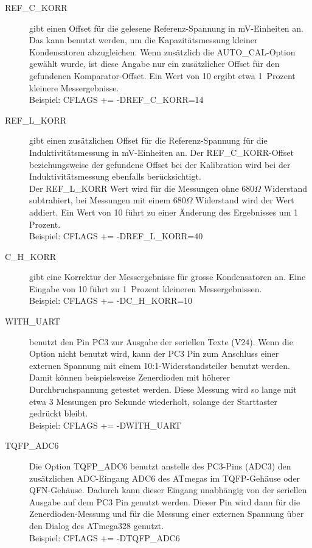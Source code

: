 \begin{description}
  \item[REF\_C\_KORR] gibt einen Offset für die gelesene Referenz-Spannung in mV-Einheiten an.
Das kann benutzt werden, um die Kapazitätsmessung kleiner Kondensatoren abzugleichen.
Wenn zusätzlich die AUTO\_CAL-Option gewählt wurde, ist diese Angabe nur ein zusätzlicher Offset für
den gefundenen Komparator-Offset.
Ein Wert von 10 ergibt etwa 1~Prozent kleinere Messergebnisse.\\
Beispiel: CFLAGS += -DREF\_C\_KORR=14

  \item[REF\_L\_KORR] gibt einen zusätzlichen Offset für die Referenz-Spannung für die Induktivitätsmessung
in mV-Einheiten an. Der REF\_C\_KORR-Offset beziehungsweise der gefundene Offset bei der Kalibration
wird bei der Induktivitätsmessung ebenfalls berücksichtigt.\\
Der REF\_L\_KORR Wert wird für die Messungen ohne \(680\Omega\) Widerstand subtrahiert, bei Messungen mit einem
\(680\Omega\) Widerstand wird der Wert addiert.
Ein Wert von 10 führt zu einer Änderung des Ergebnisses um 1 Prozent.\\
Beispiel: CFLAGS += -DREF\_L\_KORR=40

  \item[C\_H\_KORR] gibt eine Korrektur der Messergebnisse für grosse Kondensatoren an.
Eine Eingabe von 10 führt zu 1~Prozent kleineren Messergebnissen.\\
Beispiel: CFLAGS += -DC\_H\_KORR=10

  \item[WITH\_UART] benutzt den Pin PC3 zur Ausgabe der seriellen Texte (V24). Wenn die Option nicht
benutzt wird, kann der PC3 Pin zum Anschluss einer externen Spannung mit einem 10:1-Widerstandsteiler benutzt
werden. Damit können beispielsweise Zenerdioden mit höherer Durchbruchspannung getestet werden.
Diese Messung wird so lange mit etwa 3 Messungen pro Sekunde wiederholt, solange der Starttaster gedrückt bleibt.\\
Beispiel: CFLAGS += -DWITH\_UART

  \item[TQFP\_ADC6] Die Option TQFP\_ADC6 benutzt anstelle des PC3-Pins (ADC3) den zusätzlichen ADC-Eingang ADC6
des ATmegas im TQFP-Gehäuse oder QFN-Gehäuse.
Dadurch kann dieser Eingang unabhängig von der seriellen Ausgabe auf dem PC3 Pin genutzt werden. Dieser Pin wird
dann für die Zenerdioden-Messung und für die Messung einer externen Spannung über den Dialog des ATmega328 genutzt.\\
Beispiel: CFLAGS += -DTQFP\_ADC6


\end{description}
